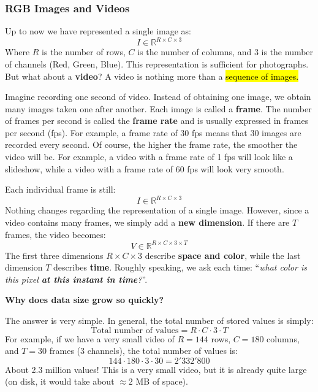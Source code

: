 \subsubsection{RGB Images and Videos}\label{sec:rgb-images-and-videos}

Up to now we have represented a single image as:
\begin{equation*}
    I \in \mathbb{R}^{R \times C \times 3}
\end{equation*}
Where $R$ is the number of rows, $C$ is the number of columns, and $3$ is the number of channels (Red, Green, Blue). This representation is sufficient for photographs. But what about a \textbf{video}? A video is nothing more than a \hl{sequence of images.}

\highspace
Imagine recording one second of video. Instead of obtaining one image, we obtain many images taken one after another. Each image is called a \textbf{frame}. The number of frames per second is called the \textbf{frame rate} and is usually expressed in frames per second (fps). For example, a frame rate of 30 fps means that 30 images are recorded every second. Of course, the higher the frame rate, the smoother the video will be. For example, a video with a frame rate of 1 fps will look like a slideshow, while a video with a frame rate of 60 fps will look very smooth.

\highspace
Each individual frame is still:
\begin{equation*}
    I \in \mathbb{R}^{R \times C \times 3}
\end{equation*}
Nothing changes regarding the representation of a single image. However, since a video contains many frames, we simply add a \textbf{new dimension}. If there are $T$ frames, the video becomes:
\begin{equation*}
    V \in \mathbb{R}^{R \times C \times 3 \times T}
\end{equation*}
The first three dimensions $R \times C \times 3$ describe \textbf{space and color}, while the last dimension $T$ describes \textbf{time}. Roughly speaking, we ask each time: ``\emph{what color is this pixel \textbf{at this instant in time}?}''.

\highspace
\begin{flushleft}
    \textcolor{Green3}{ \textbf{Why does data size grow so quickly?}}
\end{flushleft}
The answer is very simple. In general, the total number of stored values is simply:
\begin{equation*}
    \text{Total number of values} = R \cdot C \cdot 3 \cdot T
\end{equation*}
For example, if we have a very small video of $R = 144$ rows, $C = 180$ columns, and $T = 30$ frames ($3$ channels), the total number of values is:
\begin{equation*}
    144 \cdot 180 \cdot 3 \cdot 30 = 2'332'800
\end{equation*}
About 2.3 million values! This is a very small video, but it is already quite large (on disk, it would take about $\approx 2$ MB of space).

